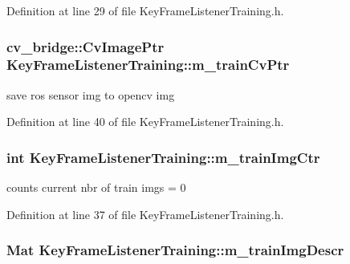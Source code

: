 \-Definition at line 29 of file \-Key\-Frame\-Listener\-Training.\-h.

\hypertarget{classKeyFrameListenerTraining_a6ae5ff8937a42f0d70404b7b8cd572c2}{
\subsubsection[{m\-\_\-train\-Cv\-Ptr}]{\setlength{\rightskip}{0pt plus 5cm}cv\-\_\-bridge\-::\-Cv\-Image\-Ptr {\bf \-Key\-Frame\-Listener\-Training\-::m\-\_\-train\-Cv\-Ptr}}}\label{classKeyFrameListenerTraining_a6ae5ff8937a42f0d70404b7b8cd572c2}


save ros sensor img to opencv img 



\-Definition at line 40 of file \-Key\-Frame\-Listener\-Training.\-h.

\hypertarget{classKeyFrameListenerTraining_a527a1a7e1b02deacba5b417fa61fc367}{
\subsubsection[{m\-\_\-train\-Img\-Ctr}]{\setlength{\rightskip}{0pt plus 5cm}int {\bf \-Key\-Frame\-Listener\-Training\-::m\-\_\-train\-Img\-Ctr}}}\label{classKeyFrameListenerTraining_a527a1a7e1b02deacba5b417fa61fc367}


counts current nbr of train imgs = 0 



\-Definition at line 37 of file \-Key\-Frame\-Listener\-Training.\-h.

\hypertarget{classKeyFrameListenerTraining_a2db812cb925b74093ef76bc16306d9d7}{
\subsubsection[{m\-\_\-train\-Img\-Descr}]{\setlength{\rightskip}{0pt plus 5cm}\-Mat {\bf \-Key\-Frame\-Listener\-Training\-::m\-\_\-train\-Img\-Descr}}}\label{classKeyFrameListenerTraining_a2db812cb925b74093ef76bc16306d9d7}


